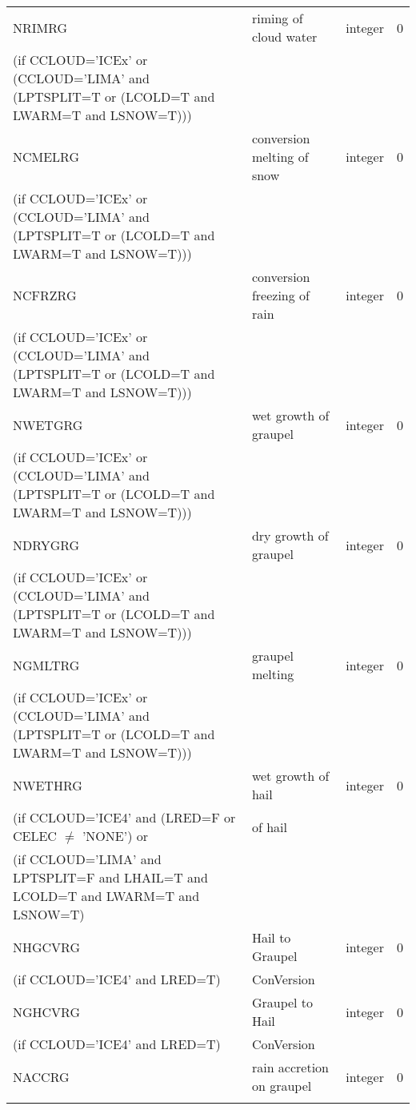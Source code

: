 \begin{longtable} {|p{}|p{}|>{\centering}p{}|p{}<{\centering}|}
NRIMRG   & riming of cloud water & integer  &  0 \index{NRIMRG!\innam{NAM\_BU\_RRG}}\\ \nopagebreak
(if CCLOUD='ICEx' or (CCLOUD='LIMA' and (LPTSPLIT=T or (LCOLD=T and LWARM=T and LSNOW=T))) & & & \\\hline
NCMELRG  & conversion melting of snow & integer  &  0 \index{NCMELRG!\innam{NAM\_BU\_RRG}}\\ \nopagebreak
(if CCLOUD='ICEx' or (CCLOUD='LIMA' and (LPTSPLIT=T or (LCOLD=T and LWARM=T and LSNOW=T))) & & & \\\hline
NCFRZRG  & conversion freezing of rain& integer  &  0 \index{NCFRZRG!\innam{NAM\_BU\_RRG}}\\ \nopagebreak
(if CCLOUD='ICEx' or (CCLOUD='LIMA' and (LPTSPLIT=T or (LCOLD=T and LWARM=T and LSNOW=T))) & & & \\\hline
NWETGRG  & wet growth of graupel  & integer  &  0 \index{NWETGRG!\innam{NAM\_BU\_RRG}}\\ \nopagebreak
(if CCLOUD='ICEx' or (CCLOUD='LIMA' and (LPTSPLIT=T or (LCOLD=T and LWARM=T and LSNOW=T))) & & & \\\hline
NDRYGRG  & dry growth of graupel  & integer  &  0 \index{NDRYGRG!\innam{NAM\_BU\_RRG}}\\ \nopagebreak
(if CCLOUD='ICEx' or (CCLOUD='LIMA' and (LPTSPLIT=T or (LCOLD=T and LWARM=T and LSNOW=T))) & & & \\\hline
NGMLTRG  & graupel melting  & integer  &  0 \index{NGMLTRG!\innam{NAM\_BU\_RRG}}\\ \nopagebreak
(if CCLOUD='ICEx' or (CCLOUD='LIMA' and (LPTSPLIT=T or (LCOLD=T and LWARM=T and LSNOW=T))) & & & \\\hline
NWETHRG  & wet growth of hail & integer  &  0 \index{NWETHRG!\innam{NAM\_BU\_RRG}}\\ \nopagebreak
(if CCLOUD='ICE4' and (LRED=F or CELEC $\neq$ 'NONE') or &of hail &   &  \\
(if CCLOUD='LIMA' and LPTSPLIT=F and LHAIL=T and LCOLD=T and LWARM=T and LSNOW=T) & &   &  \\\hline
NHGCVRG  & Hail to Graupel  & integer  &  0 \index{NHGCVRG!\innam{NAM\_BU\_RRG}}\\ \nopagebreak
(if CCLOUD='ICE4' and LRED=T) & ConVersion  &   &  \\\hline
NGHCVRG  & Graupel to Hail  & integer  &  0 \index{NGHCVRG!\innam{NAM\_BU\_RRG}}\\ \nopagebreak
(if CCLOUD='ICE4' and LRED=T) & ConVersion  &   &  \\\hline
NACCRG  & rain accretion on graupel & integer  &  0 \index{NACCRG!\innam{NAM\_BU\_RRG}}\\ \nopagebreak

\end{longtable}
